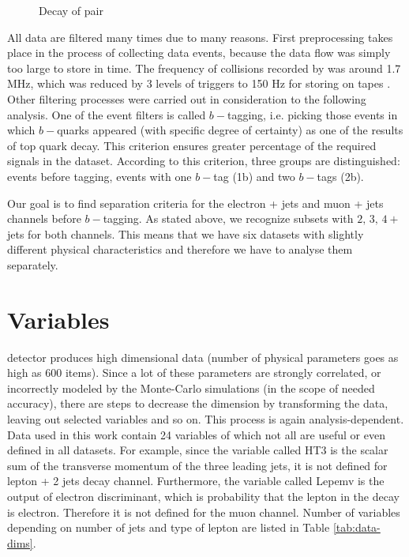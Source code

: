 \begin{figure}[thb]
  \centering
  \caption{Decay of \ttbar pair}
\end{figure} 

All data are filtered many times due to many reasons. First preprocessing takes  place in the process of collecting data events, because the data flow was simply too large to store in time. The frequency of collisions recorded by \dzero was around 1.7 MHz, which was reduced by 3 levels of triggers to 150 Hz for storing on tapes \cite{Yuntse}. Other filtering processes were carried out in consideration to the following analysis. One of the event filters is called $b-$tagging, i.e. picking those events in which $b-$quarks appeared (with specific degree of certainty) as one of the results of top quark decay. This criterion ensures greater percentage of the required signals in the dataset. According to this criterion, three groups are distinguished: events before tagging, events with one $b-$tag (1b) and two $b-$tags (2b).

Our goal is to find separation criteria for the electron + jets and muon + jets channels before $b-$tagging. As stated above, we recognize subsets with $2, \,3,\, 4+$ jets for both channels. This means that we have six datasets with slightly different physical characteristics and therefore we have to analyse them separately. 

\section{Variables}\label{sec:Variables}

\dzero detector  produces high dimensional data (number of physical parameters  goes as high as $600$ items). Since a lot of these parameters are strongly correlated, or incorrectly modeled by the Monte-Carlo simulations (in the scope of needed accuracy), there are steps to decrease the dimension by transforming the data, leaving out selected variables and so on. This process is again analysis-dependent. Data used in this work contain 24 variables of which not all are useful or even defined in all datasets. For example, since the variable called \textsf{HT3} is the scalar sum of the transverse momentum of the three leading jets, it is not defined for lepton + 2 jets decay channel. Furthermore, the variable called \textsf{Lepemv} is the output of electron discriminant, which is probability that the lepton in the decay is electron. Therefore it is not defined for the muon channel. Number of variables depending on number of jets and type of lepton are listed in Table \ref{tab:data-dims}.

